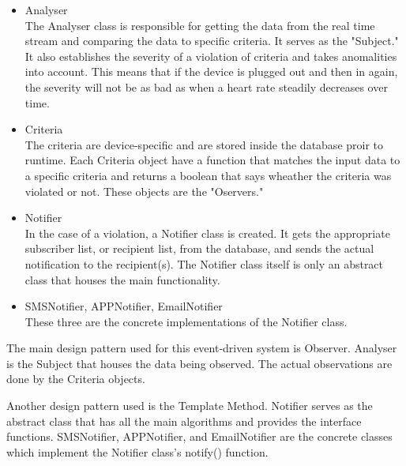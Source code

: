 \begin{itemize}
	\item Analyser\\
	The Analyser class is responsible for getting the data from the real time stream and comparing the data to specific criteria. It serves as the "Subject." It also establishes the severity of a violation of criteria and takes anomalities into account. This means that if the device is plugged out and then in again, the severity will not be as bad as when a heart rate steadily decreases over time. 	
	
	\item Criteria\\
	The criteria are device-specific and are stored inside the database proir to runtime. Each Criteria object have a function that matches the input data to a specific criteria and returns a boolean that says wheather the criteria was violated or not. These objects are the "Oservers."
	
	\item Notifier\\
	In the case of a violation, a Notifier class is created. It gets the appropriate subscriber list, or recipient list, from the database, and sends the actual notification to the recipient(s). The Notifier class	itself is only an abstract class that houses the main functionality.
	
	\item SMSNotifier, APPNotifier, EmailNotifier\\
	These three are the concrete implementations of the Notifier class.
\end{itemize}

The main design pattern used for this event-driven system is Observer. Analyser is the Subject that houses the data being observed. The actual observations are done by the Criteria objects. 

Another design pattern used is the Template Method. Notifier serves as the abstract class that has all the main algorithms and provides the interface functions. SMSNotifier, APPNotifier, and EmailNotifier are the concrete classes which implement the Notifier class's notify() function.